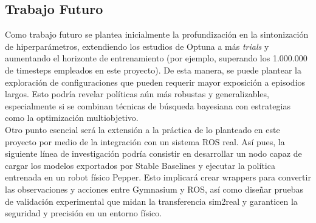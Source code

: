 \subsection{Trabajo Futuro}

Como trabajo futuro se plantea inicialmente la profundización en la sintonización de hiperparámetros, extendiendo los estudios de Optuna a más \textit{trials} y aumentando el horizonte de entrenamiento (por ejemplo, superando los 1.000.000 de timesteps empleados en este proyecto). De esta manera, se puede plantear la exploración de configuraciones que pueden requerir mayor exposición a episodios largos. Esto podría revelar políticas aún más robustas y generalizables, especialmente si se combinan técnicas de búsqueda bayesiana con estrategias como la optimización multiobjetivo.\\

Otro punto esencial será la extensión a la práctica de lo planteado en este proyecto por medio de la integración con un sistema ROS real. Así pues, la siguiente línea de investigación podría consistir en desarrollar un nodo capaz de cargar los modelos exportados por Stable Baselines y ejecutar la política entrenada en un robot físico Pepper. Esto implicará crear wrappers para convertir las observaciones y acciones entre Gymnasium y ROS, así como diseñar pruebas de validación experimental que midan la transferencia sim2real y garanticen la seguridad y precisión en un entorno físico.
